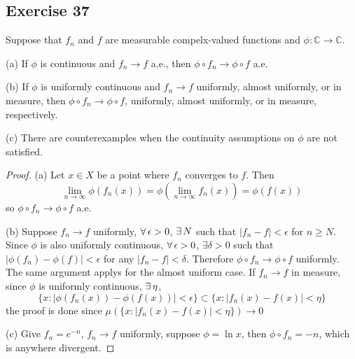 \subsection*{Exercise 37}
Suppose that $f_n$ and $f$ are measurable compelx-valued functions and $\phi:\mathbb{C}\to\mathbb{C}$.
\par (a) If $\phi$ is continuous and $f_n\to f$ a.e., then $\phi\circ f_n\to\phi\circ f$ a.e.
\par (b) If $\phi$ is uniformly continuous and $f_n\to f$ uniformly, almost uniformly, or in measure, then $\phi\circ f_n\to\phi\circ f$, uniformly, almost uniformly, or in measure, respectively.
\par (c) There are counterexamples when the continuity assumptions on $\phi$ are not satisfied.
\begin{proof}
    \par (a) Let $x\in X$ be a point where $f_n$ converges to $f$. Then
    $$
    \lim_{n\to\infty}\phi(f_n(x))=\phi(\lim_{n\to\infty}f_n(x))=\phi(f(x))
    $$
    so $\phi\circ f_n\to\phi\circ f$ a.e.
    \par (b) Suppose $f_n\to f$ uniformly, $\forall\,\epsilon>0$, $\exists\, N$ such that $|f_n-f|<\epsilon$ for $n\ge N$. Since $\phi$ is also uniformly continuous, $\forall\,\epsilon>0$, $\exists \delta>0$ such that $|\phi(f_n)-\phi(f)|<\epsilon$ for any $|f_n-f|<\delta$. Therefore $\phi\circ f_n\to\phi\circ f$ uniformly. The same argument applys for the almost uniform case. If $f_n\to f$ in measure, since $\phi$ is uniformly continuous, $\exists\,\eta$,
    $$
    \{x:|\phi(f_n(x))-\phi(f(x))|<\epsilon\}\subset \{x:|f_n(x)-f(x)|<\eta\}
    $$
    the proof is done since $\mu(\{x:|f_n(x)-f(x)|<\eta\})\to 0$
    \par (c) Give $f_n=e^{-n}$, $f_n\to f$ uniformly, suppose $\phi=\ln x$, then $\phi\circ f_n=-n$, which is anywhere divergent.
\end{proof}
